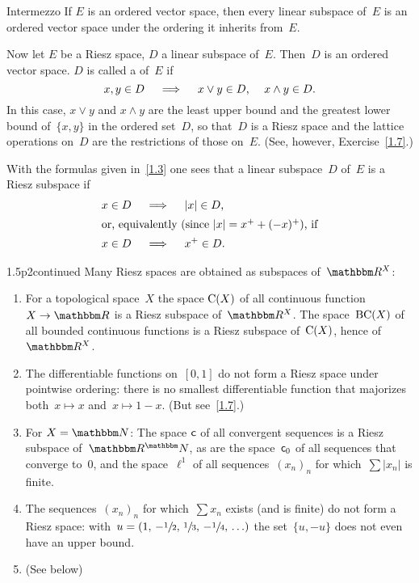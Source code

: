 \documentclass[main.tex]{subfiles}
\begin{document}
\begin{psec}{1.6}{Intermezzo}
If $E$ is an ordered vector space, 
then every linear subspace of~$E$ is an ordered vector space
under the ordering it inherits from~$E$.

Now let $E$ be a Riesz space,
$D$ a linear subspace of~$E$.
Then~$D$ is an ordered vector space.
$D$ is called a  of~$E$
if
\begin{equation*}
x,y\in D \quad \implies \quad x\vee y\in D\text{, }\quad x\wedge y\in D
\text{.}
\end{equation*}
In this case,
$x\vee y$ and $x\wedge y$ are the least upper bound
and the greatest lower bound of~$\{x,y\}$ in the ordered set~$D$,
so that~$D$ is a Riesz space and the lattice operations on~$D$
are the restrictions of those on~$E$.
(See, however, Exercise~\ref{1.7}.)

With the formulas given in~\ref{1.3} one sees
that a linear subspace~$D$ of~$E$ is a Riesz subspace if
\begin{align*}
x\in D\quad &\implies \quad |x|\in D
\htam{,} \\ 
\intertext{%
or, 
equivalently
(since $|x|=x^+ + (-x)^+$), if}
x\in D \quad &\implies \quad x^+ \in D
\htam{.}
\end{align*}
\end{psec}
%
%
\begin{psec}[1.5]{1.5p2}{continued}
Many Riesz spaces are obtained as subspaces of~$\R^X$:
\begin{enumerate}
\setcounter{enumi}{\value{list-1.5}}
\item
\label{1.5-3}
For a topological space~$X$ the space $\mathrm{C}(X)$
of all continuous function~$X\ra\R$ is a Riesz subspace of~$\R^X$.
The space~$\mathrm{BC}(X)$ of all bounded continuous functions 
is a Riesz subspace of~$\mathrm{C}(X)$,
hence of~$\R^X$.
%
\item
\label{1.5-4}
The differentiable functions on~$[0,1]$ 
do not form a Riesz space
under pointwise ordering:
there is no smallest differentiable function
that majorizes both~$x\mapsto x$ and~$x\mapsto 1-x$.
(But see~\ref{1.7}.)
%
\item
\label{1.5-5}
For $X=\N$: 
The space $\mathsf{c}$ of all convergent sequences 
is a Riesz subspace of~$\R^\N$,
as are the space~$\mathsf{c}_0$
of all sequences that converge to~$0$,
and the space~$\ell^1$
of all sequences~$(x_n)_n$
for which~$\sum|x_n|$ is finite.
%
\item
\label{1.5-6}
The sequences~$(x_n)_n$ for which~$\sum x_n$ exists (and is finite)
do not form a Riesz space:
with~$u=(1,\,-\sfrac{1}{2},\, \sfrac{1}{3},\, -\sfrac{1}{4},\, \ldots)$
the set~$\{u,-u\}$
does not even have an upper bound.
%
\setcounter{list-1.5}{\value{enumi}}
\item
(See below)
\end{enumerate}
\end{psec}
\end{document}
